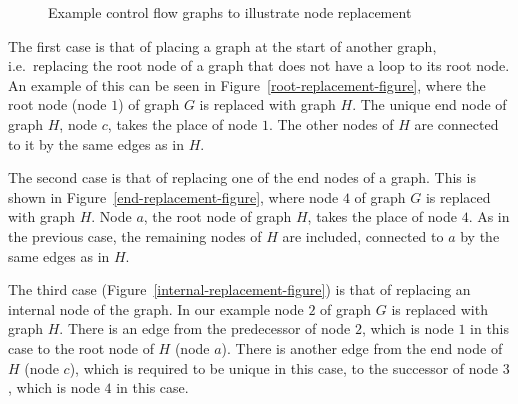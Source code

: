 \begin{figure}
  \begin{center}
    \caption{Example control flow graphs to illustrate node
      replacement}
    \label{G-H-examples-figure}
  \end{center}
\end{figure}

The first case is that of placing a graph at the start of another
graph, i.e.\ replacing the root node of a graph that does not have a
loop to its root node.
An example of this can be seen in
Figure~\ref{root-replacement-figure}, where the root node (node $1$)
of graph $G$ is replaced with graph $H$.
The unique end node of graph $H$, node $c$, takes the place of node
$1$.
The other nodes of $H$ are connected to it by the same edges as in
$H$.

The second case is that of replacing one of the end nodes of a graph.
This is shown in Figure~\ref{end-replacement-figure}, where node $4$
of graph $G$ is replaced with graph $H$.
Node $a$, the root node of graph $H$, takes the place of node $4$.
As in the previous case, the remaining nodes of $H$ are included,
connected to $a$ by the same edges as in $H$.

The third case (Figure~\ref{internal-replacement-figure}) is that of
replacing an internal node of the graph.
In our example node $2$ of graph $G$ is replaced with graph $H$.
There is an edge from the predecessor of node $2$, which is node $1$
in this case to the root node of $H$ (node $a$).
There is another edge from the end node of $H$ (node $c$), which is
required to be unique in this case, to the successor of node $3$,
which is node $4$ in this case.

